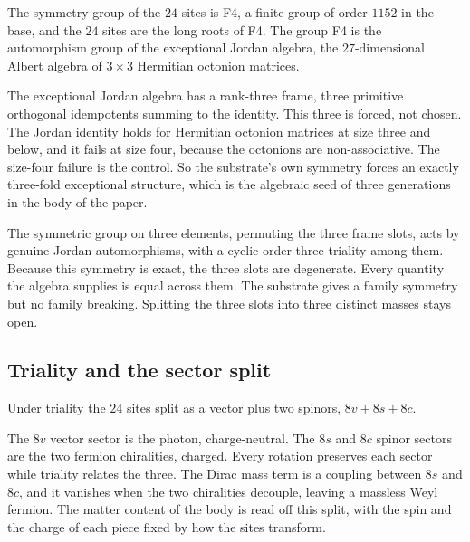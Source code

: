 \begin{theorem}
The symmetry group of the $24$ sites is F4, a finite group of order $1152$ in the base, and the $24$ sites are the long roots of F4. The group F4 is the automorphism group of the exceptional Jordan algebra, the $27$-dimensional Albert algebra of $3 \times 3$ Hermitian octonion matrices.
\end{theorem}

The exceptional Jordan algebra has a rank-three frame, three primitive orthogonal idempotents summing to the identity. This three is forced, not chosen. The Jordan identity holds for Hermitian octonion matrices at size three and below, and it fails at size four, because the octonions are non-associative. The size-four failure is the control. So the substrate's own symmetry forces an exactly three-fold exceptional structure, which is the algebraic seed of three generations in the body of the paper.

\begin{result}
The symmetric group on three elements, permuting the three frame slots, acts by genuine Jordan automorphisms, with a cyclic order-three triality among them. Because this symmetry is exact, the three slots are degenerate. Every quantity the algebra supplies is equal across them. The substrate gives a family symmetry but no family breaking. Splitting the three slots into three distinct masses stays open.
\end{result}

\subsection{Triality and the sector split}

\begin{proposition}
Under triality the $24$ sites split as a vector plus two spinors, $8v + 8s + 8c$.
\end{proposition}

The $8v$ vector sector is the photon, charge-neutral. The $8s$ and $8c$ spinor sectors are the two fermion chiralities, charged. Every rotation preserves each sector while triality relates the three. The Dirac mass term is a coupling between $8s$ and $8c$, and it vanishes when the two chiralities decouple, leaving a massless Weyl fermion. The matter content of the body is read off this split, with the spin and the charge of each piece fixed by how the sites transform.

